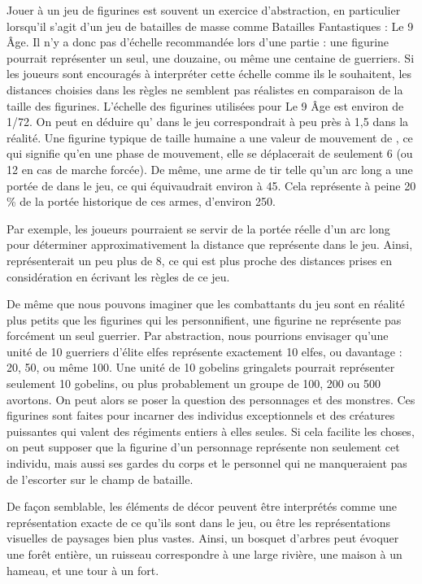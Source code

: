 Jouer à un jeu de figurines est souvent un exercice d'abstraction, en particulier lorsqu'il s'agit d'un jeu de batailles de masse comme Batailles Fantastiques : Le 9\ieme{} Âge. Il n'y a donc pas d'échelle recommandée lors d'une partie : une figurine pourrait représenter un seul, une douzaine, ou même une centaine de guerriers. Si les joueurs sont encouragés à interpréter cette échelle comme ils le souhaitent, les distances choisies dans les règles ne semblent pas réalistes en comparaison de la taille des figurines. L'échelle des figurines utilisées pour Le 9\ieme{} Âge est environ de 1/72. On peut en déduire qu' dans le jeu correspondrait à peu près à 1,5 {\meter} dans la réalité. Une figurine typique de taille humaine a une valeur de mouvement de , ce qui signifie qu'en une phase de mouvement, elle se déplacerait de seulement \unit{6}{\meter} (ou \unit{12}{\meter} en cas de marche forcée). De même, une arme de tir telle qu'un arc long a une portée de  dans le jeu, ce qui équivaudrait environ à \unit{45}{\meter}. Cela représente à peine 20 \% de la portée historique de ces armes, d'environ \unit{250}{\meter}.

Par exemple, les joueurs pourraient se servir de la portée réelle d'un arc long pour déterminer approximativement la distance que représente  dans le jeu. Ainsi,  représenterait un peu plus de \unit{8}{\meter}, ce qui est plus proche des distances prises en considération en écrivant les règles de ce jeu.

De même que nous pouvons imaginer que les combattants du jeu sont en réalité plus petits que les figurines qui les personnifient, une figurine ne représente pas forcément un seul guerrier. Par abstraction, nous pourrions envisager qu'une unité de 10 guerriers d'élite elfes représente exactement 10 elfes, ou davantage : 20, 50, ou même 100. Une unité de 10 gobelins gringalets pourrait représenter seulement 10 gobelins, ou plus probablement un groupe de 100, 200 ou 500 avortons. On peut alors se poser la question des personnages et des monstres. Ces figurines sont faites pour incarner des individus exceptionnels et des créatures puissantes qui valent des régiments entiers à elles seules. Si cela facilite les choses, on peut supposer que la figurine d'un personnage représente non seulement cet individu, mais aussi ses gardes du corps et le personnel qui ne manqueraient pas de l'escorter sur le champ de bataille.

De façon semblable, les éléments de décor peuvent être interprétés comme une représentation exacte de ce qu'ils sont dans le jeu, ou être les représentations visuelles de paysages bien plus vastes. Ainsi, un bosquet d'arbres peut évoquer une forêt entière, un ruisseau correspondre à une large rivière, une maison à un hameau, et une tour à un fort.

